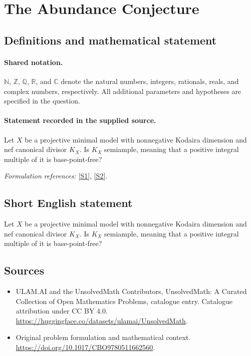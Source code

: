 \documentclass[11pt]{article}
\newcommand{\sref}[2]{\hyperlink{source:#1:#2}{[S#2]}}
\begin{document}
\section{The Abundance Conjecture}\label{statement}

\subsection{Definitions and mathematical statement}

\paragraph{Shared notation.}$\mathbb N$, $\mathbb Z$, $\mathbb Q$, $\mathbb R$, and $\mathbb C$ denote the natural numbers, integers, rationals, reals, and complex numbers, respectively. All additional parameters and hypotheses are specified in the question.


\paragraph{Statement recorded in the supplied source.}
Let $X$ be a projective minimal model with nonnegative Kodaira dimension and nef canonical divisor $K_X$. Is $K_X$ semiample, meaning that a positive integral multiple of it is base-point-free?
\par\smallskip\textit{Formulation references:} \sref{statement}{1}, \sref{statement}{2}.
\subsection{Short English statement}
Let $X$ be a projective minimal model with nonnegative Kodaira dimension and nef canonical divisor $K_X$. Is $K_X$ semiample, meaning that a positive integral multiple of it is base-point-free?
\subsection{Sources}
\begin{itemize}
\item[\hypertarget{source:statement:1}{S1}] ULAM.AI and the UnsolvedMath Contributors, UnsolvedMath: A Curated Collection of Open Mathematics Problems, catalogue entry. Catalogue attribution under CC BY 4.0.
\url{https://huggingface.co/datasets/ulamai/UnsolvedMath}.
\item[\hypertarget{source:statement:2}{S2}] Original problem formulation and mathematical context.
\url{https://doi.org/10.1017/CBO9780511662560}.
\end{itemize}
\label{end:statement}
\end{document}
